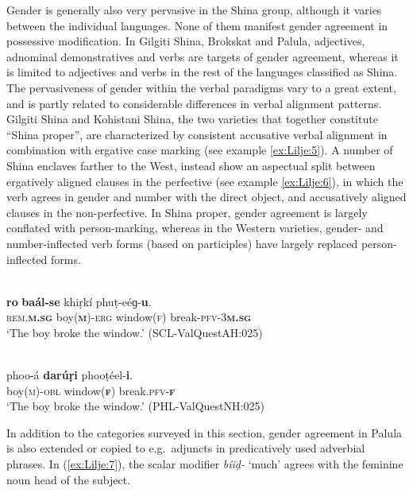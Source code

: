 \documentclass[output=collectionpaper]{langsci/langscibook}
\begin{document}
Gender is generally also very pervasive in the Shina group, although it varies between the individual languages. None of them manifest gender agreement in possessive modification. In Gilgiti Shina, Brokskat and Palula, adjectives, adnominal demonstratives and verbs are targets of gender agreement, whereas it is limited to adjectives and verbs in the rest of the languages classified as Shina. The pervasiveness of gender within the verbal paradigms vary to a great extent, and is partly related to considerable differences in verbal alignment patterns. Gilgiti Shina and Kohistani Shina, the two varieties that together constitute ``Shina proper'', are characterized by consistent accusative verbal alignment in combination with ergative case marking (see example \ref{ex:Lilje:5}). A number of Shina enclaves farther to the West, instead show an aspectual split between ergatively aligned clauses in the perfective (see example \ref{ex:Lilje:6}), in which the verb agrees in gender and number with the direct object, and accusatively aligned clauses in the non-perfective. In Shina proper, gender agreement is largely conflated with person-marking, whereas in the Western varieties, gender- and number-inflected verb forms (based on participles) have largely replaced person-inflected forms.

\ea
\label{ex:Lilje:5}
\\
\gll \textbf{ro} \textbf{baál}\textbf{{}-}\textbf{se} khiṛkí phuṭ-eéɡ-\textbf{u}.    \\
\textsc{rem.}\textbf{\textsc{m.sg}} boy(\textbf{\textsc{m}})-\textsc{erg} window(\textsc{f}) break\textsc{{}-pfv-3}\textbf{\textsc{m.sg}}    \\
\glt `The boy broke the window.' (SCL-ValQuestAH:025)
\z

\ea
\label{ex:Lilje:6}
\\
\gll phoo-á \textbf{darúṛi} phooṭéel-\textbf{i}.     \\
boy(\textsc{m})\textsc{{}-obl} window(\textbf{\textsc{f}}) break.\textsc{pfv-}\textbf{\textsc{f}}     \\
\glt `The boy broke the window.' (PHL-ValQuestNH:025)
\z

In addition to the categories surveyed in this section, gender agreement in Palula is also extended or copied to e.g.\ adjuncts in predicatively used adverbial phrases. In (\ref{ex:Lilje:7}), the scalar modifier \textit{bíiḍ-} `much' agrees with the feminine noun head of the subject.
\end{document}
